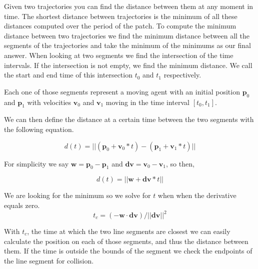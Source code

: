 Given two trajectories you can find the distance between them at any moment in time. The shortest distance between trajectories is the minimum of all these distances computed over the period of the patch. To compute the minimum distance between two trajectories we find the minimum distance between all the segments of the trajectories and take the minimum of the minimums as our final answer. When looking at two segments we find the intersection of the time intervals. If the intersection is not empty, we find the minimum distance. We call the start and end time of this intersection $t_0$ and $t_1$ respectively.

Each one of those segments represent a moving agent with an initial position $\mathbf{p}_0$ and $\mathbf{p}_1$ with velocities $\mathbf{v}_0$ and $\mathbf{v}_1$ moving in the time interval $[t_0,t_1]$. 

We can then define the distance at a certain time between the two segments with the following equation.

\begin{equation}
	d(t) = || (\mathbf{p}_0+\mathbf{v}_0*t) - (\mathbf{p}_1+\mathbf{v}_1*t) ||
	\label{eqn:distance}
\end{equation}

For simplicity we say $ \mathbf{w} = \mathbf{p}_0-\mathbf{p}_1$ and $\mathbf{dv} = \mathbf{v}_0-\mathbf{v}_1$, so then,

\begin{equation}
	d(t) = || \mathbf{w} + \mathbf{dv}*t ||
	\label{eqn:distance_simple}
\end{equation}



We are looking for the minimum so we solve for $t$ when when the derivative equals zero.
\begin{equation}
	t_c = (-\mathbf{w} \cdot \mathbf{dv}) / || \mathbf{dv} ||^2
\end{equation}

With $t_c$, the time at which the two line segments are closest we can easily calculate the position on each of those segments, and thus the distance between them. If the time is outside the bounds of the segment we check the endpoints of the line segment for collision.


